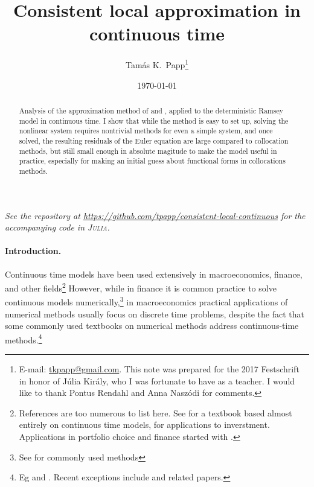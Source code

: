 \documentclass[a4paper,11pt]{article}
\begin{document}
\title{Consistent local approximation in continuous time}
\author{Tam\'as K.~Papp\thanks{E-mail: \url{tkpapp@gmail.com}. This note was prepared for the 2017 Festschrift in honor of Júlia Király, who I was fortunate to have as a teacher. I would like to thank Pontus Rendahl and Anna Naszódi for comments.}}
\date{\today}
\maketitle

\begin{abstract}
  Analysis of the approximation method of \textcite{den2015exact} and \textcite{levintal2016taylor}, applied to the deterministic Ramsey model in continuous time. I show that while the method is easy to set up, solving the nonlinear system requires nontrivial methods for even a simple system, and once solved, the resulting residuals of the Euler equation are large compared to collocation methods, but still small enough in absolute magitude to make the model useful in practice, especially for making an initial guess about functional forms in collocations methods. 
\end{abstract}

\begin{center}
  \textsl{See the repository at \url{https://github.com/tpapp/consistent-local-continuous}
    for the accompanying code in \textsc{Julia}\nocite{bezanson17:_julia}.}
\end{center}

\paragraph{Introduction.}

Continuous time models have been used extensively in macroeconomics, finance, and other fields\footnote{References are too numerous to list here. See \textcite{acemoglu2008introduction} for a textbook based almost entirely on continuous time models, \textcite{dixit1996investment} for applications to inverstment. Applications in portfolio choice and finance started with \textcite{merton1971optimum}.} However, while in finance it is common practice to solve continuous models numerically,\footnote{See \textcite{hull2009options} for commonly used methods} in macroeconomics practical applications of numerical methods usually focus on discrete time problems, despite the fact that some commonly used textbooks on numerical methods address continuous-time methods.\footnote{Eg \textcite{judd98:_numer_method_in_econom} and \textcite{miranda02:_applied_comput_econom_and_finan}. Recent exceptions include \textcite{kaplan2016monetary} and related papers.}
\end{document}
